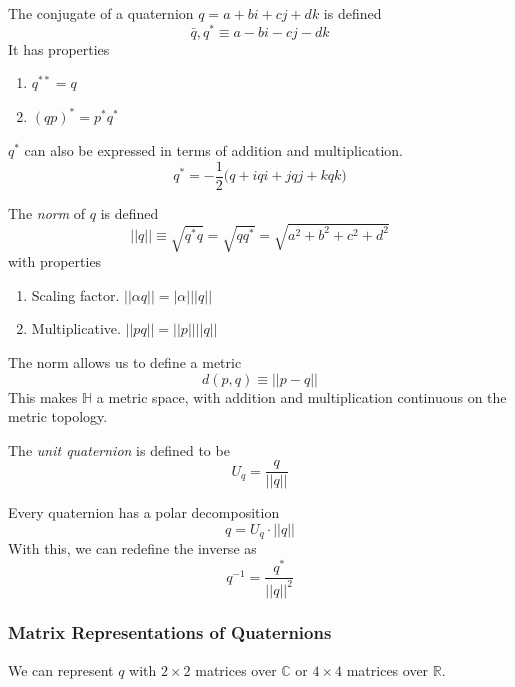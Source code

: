 \documentclass{article}
\begin{document}
    \begin{definition}
    The conjugate of a quaternion $q = a + bi + cj + dk$ is defined 
    \[\bar{q}, q^* \equiv a - bi - cj - dk\]
    It has properties
    \begin{enumerate}
        \item $q^{**} = q$
        \item $(q p)^* = p^* q^*$
    \end{enumerate}
    $q^*$ can also be expressed in terms of addition and multiplication. 
    \[q^* = -\frac{1}{2} \big( q + iqi + jqj + kqk \big)\]
    \end{definition}

    \begin{definition}
    The \textit{norm} of $q$ is defined
    \[||q|| \equiv \sqrt{q^* q} = \sqrt{q q^*} = \sqrt{a^2 + b^2 + c^2 + d^2}\]
    with properties
    \begin{enumerate}
        \item Scaling factor. $||\alpha q|| = |\alpha| ||q||$
        \item Multiplicative. $||p q|| = ||p|| ||q||$
    \end{enumerate}
    \end{definition}

    The norm allows us to define a metric 
    \[d(p, q) \equiv ||p - q||\]
    This makes $\mathbb{H}$ a metric space, with addition and multiplication continuous on the metric topology. 

    \begin{definition}
    The \textit{unit quaternion} is defined to be
    \[U_q = \frac{q}{||q||}\]
    \end{definition}

    \begin{corollary}
    Every quaternion has a polar decomposition
    \[q = U_q \cdot ||q||\]
    With this, we can redefine the inverse as
    \[q^{-1} = \frac{q^*}{||q||^2}\]
    \end{corollary}

    \subsubsection{Matrix Representations of Quaternions}

      We can represent $q$ with $2 \times 2$ matrices over $\mathbb{C}$ or $4\times 4 $ matrices over $\mathbb{R}$. 
\end{document}
